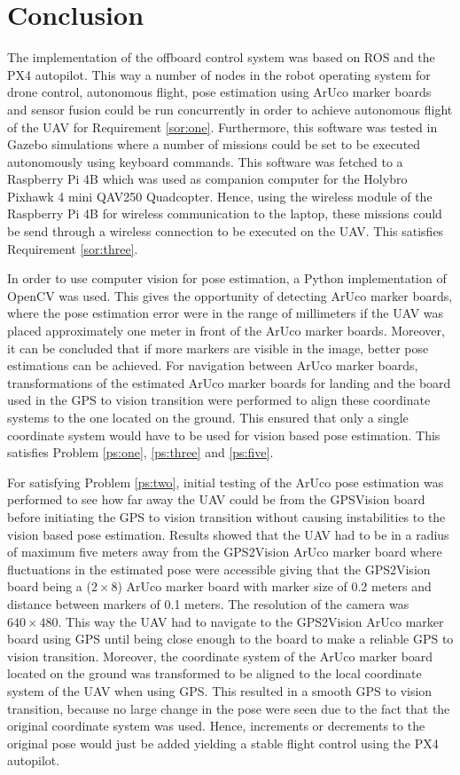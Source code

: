 \documentclass[../Head/report.tex]{subfiles}
\begin{document}
\section{Conclusion}
\label{sec:conclusion}

The implementation of the offboard control system was based on ROS and the PX4 autopilot. This way a number of nodes in the robot operating system for drone control, autonomous flight, pose estimation using ArUco marker boards and sensor fusion could be run concurrently in order to achieve autonomous flight of the UAV for Requirement \ref{sor:one}. Furthermore, this software was tested in Gazebo simulations where a number of missions could be set to be executed autonomously using keyboard commands. This software was fetched to a Raspberry Pi 4B which was used as companion computer for the Holybro Pixhawk 4 mini QAV250 Quadcopter. Hence, using the wireless module of the Raspberry Pi 4B for wireless communication to the laptop, these missions could be send through a wireless connection to be executed on the UAV. This satisfies Requirement \ref{sor:three}.     

In order to use computer vision for pose estimation, a Python implementation of OpenCV was used. This gives the opportunity of detecting ArUco marker boards, where the pose estimation error were in the range of millimeters if the UAV was placed approximately one meter in front of the ArUco marker boards. Moreover, it can be concluded that if more markers are visible in the image, better pose estimations can be achieved. For navigation between ArUco marker boards, transformations of the estimated ArUco marker boards for landing and the board used in the GPS to vision transition were performed to align these coordinate systems to the one located on the ground. This ensured that only a single coordinate system would have to be used for vision based pose estimation. This satisfies Problem \ref{ps:one}, \ref{ps:three} and \ref{ps:five}.

For satisfying Problem \ref{ps:two}, initial testing of the ArUco pose estimation was performed to see how far away the UAV could be from the GPSVision board before initiating the GPS to vision transition without causing instabilities to the vision based pose estimation. Results showed that the UAV had to be in a radius of maximum five meters away from the GPS2Vision ArUco marker board where fluctuations in the estimated pose were accessible giving that the GPS2Vision board being a ($2 \times 8 $) ArUco marker board with marker size of 0.2 meters and distance between markers of 0.1 meters. The resolution of the camera was $640 \times 480$. This way the UAV had to navigate to the GPS2Vision ArUco marker board using GPS until being close enough to the board to make a reliable GPS to vision transition. Moreover, the coordinate system of the ArUco marker board located on the ground was transformed to be aligned to the local coordinate system of the UAV when using GPS. This resulted in a smooth GPS to vision transition, because no large change in the pose were seen due to the fact that the original coordinate system was used. Hence, increments or decrements to the original pose would just be added yielding a stable   flight control using the PX4 autopilot.
\end{document}
